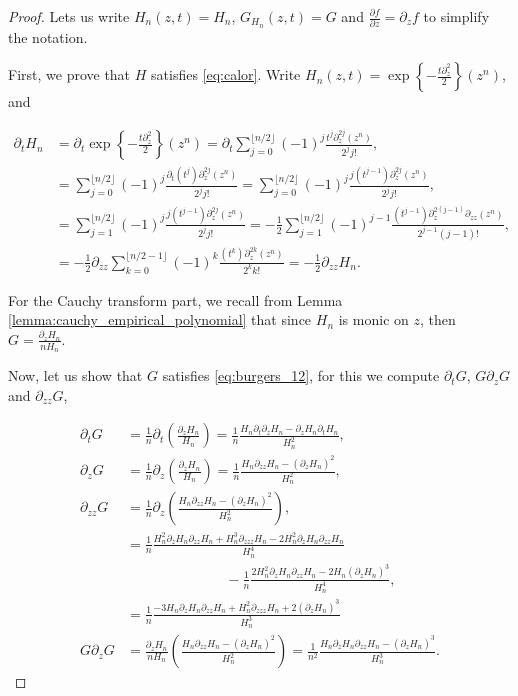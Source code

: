 \begin{proof}

    Lets us write $H_n(z,t)= H_n$, $G_{H_n}(z,t) = G$ and $\frac{\partial f}{\partial z} = \partial_z f$ to simplify the notation.

    First, we prove that $H$ satisfies \eqref{eq:calor}. Write $H_n(z,t) = \exp\left\{-\frac{t \partial_z^2}{2}\right\}(z^n)$, and

    \begin{align*}
        \partial_t H_n &= \partial_t \exp\left\{-\frac{t \partial_z^2}{2}\right\}(z^n) 
        = \partial_t \sum_{j=0}^{\lfloor n/2 \rfloor} (-1)^j \frac{t^j \partial_z^{2j}(z^n) }{2^j j!},\\ 
        &= \sum_{j=0}^{\lfloor n/2 \rfloor} (-1)^j \frac{\partial_t (t^j) \partial_z^{2j}(z^n) }{2^j j!} = \sum_{j=0}^{\lfloor n/2 \rfloor} (-1)^j \frac{j(t^{j-1}) \partial_z^{2j}(z^n) }{2^j j!},\\ 
        &= \sum_{j=1}^{\lfloor n/2 \rfloor} (-1)^j \frac{j(t^{j-1}) \partial_z^{2j}(z^n) }{2^j j!}= -\frac12\sum_{j=1}^{\lfloor n/2 \rfloor} (-1)^{j-1} \frac{(t^{j-1}) \partial_z^{2(j-1)}\partial_{zz}(z^n) }{2^{j-1} (j-1)!}, \\ 
        &= -\frac12\partial_{zz} \sum_{k=0}^{\lfloor n/2 - 1\rfloor} (-1)^{k} \frac{(t^{k}) \partial_z^{2k}(z^n) }{2^{k} k!} = - \frac12 \partial_{zz} H_n.
    \end{align*}

    
    
    For the Cauchy transform part, we recall from Lemma \ref{lemma:cauchy_empirical_polynomial} that since $H_n$ is monic on $z$, then  $G= \frac{\partial_z H_n}{nH_n}$.

    Now, let us show that $G$ satisfies \eqref{eq:burgers_12}, for this we compute $\partial_t G$, $G\partial_z G$ and $\partial_{zz}G$,

    \begin{align*}
        \partial_t G &= \frac1n\partial_t \left( \frac{\partial_z H_n}{H_n} \right) = \frac1n\frac{ H_n \partial_t \partial_z H_n - \partial_z H_n \partial_t H_n }{H_n^2},\\ 
        \partial_z G &= \frac1n\partial_z \left( \frac{\partial_z H_n}{H_n} \right) = \frac1n\frac{H_n \partial_{zz}H_n - (\partial_z H_n)^2}{H_n^2},\\ 
        \partial_{zz} G &= \frac1n\partial_z \left( \frac{H_n \partial_{zz}H_n - (\partial_z H_n)^2}{H_n^2} \right), \\ 
        &= \frac1n \frac{ H_n^2\partial_z H_n \partial_{zz}H_n + H_n^3\partial_{zzz}H_n - 2H_n^2\partial_z H_n \partial_{zz}H_n }{H_n^4} \\
        & \phantom{separadoasídem}-\frac1n\frac{2H_n^2\partial_z H_n \partial_{zz}H_n - 2 H_n (\partial_z H_n)^3}{H_n^4},\\
        &= \frac1n\frac{-3H_n\partial_z H_n \partial_{zz}H_n + H_n^2 \partial_{zzz}H_n + 2(\partial_z H_n)^3}{H_n^3} \\
        G\partial_z G &= \frac{\partial_z H_n}{nH_n}\left( \frac{H_n \partial_{zz}H_n - (\partial_z H_n)^2}{H_n^2}  \right) = \frac{1}{n^2}\frac{H_n\partial_z H_n \partial_{zz}H_n - (\partial_z H_n)^3}{H_n^3}.
    \end{align*}


\end{proof}
